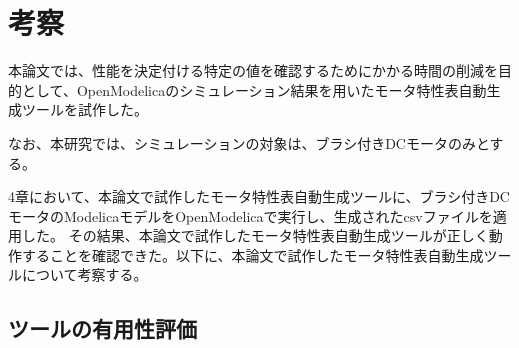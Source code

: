 \chapter{考察}\label{cha:Discussion}
本論文では、性能を決定付ける特定の値を確認するためにかかる時間の削減を目的として、OpenModelicaのシミュレーション結果を用いたモータ特性表自動生成ツールを試作した。

なお、本研究では、シミュレーションの対象は、ブラシ付きDCモータのみとする。

4章において、本論文で試作したモータ特性表自動生成ツールに、ブラシ付きDCモータのModelicaモデルをOpenModelicaで実行し、生成されたcsvファイルを適用した。
その結果、本論文で試作したモータ特性表自動生成ツールが正しく動作することを確認できた。以下に、本論文で試作したモータ特性表自動生成ツールについて考察する。
\section{ツールの有用性評価}





